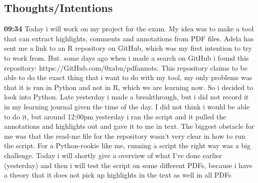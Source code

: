 \documentclass{article}
\begin{document}
\subsection{Thoughts/Intentions}
\textbf{09:34} Today i will work on my project for the exam. My idea was to make a tool that can extract highlights, comments and annotations from PDF files. Adela has sent me a link to an R repository on GitHub, which was my first intention to try to work from. But. some days ago when i made a search on GitHub i found this repository: https://GitHub.com/0xabu/pdfannots. This repository claims to be able to do the exact thing that i want to do with my tool, my only problems was that it is run in Python and not in R, which we are learning now. So i decided to look into Python. Late yesterday i made a breakthrough, but i did not record it in my learning journal given the time of the day. I did not think i would be able to do it, but around 12:00pm yesterday i ran the script and it pulled the annotations and highlights out and gave it to me in text. The biggest obstacle for me was that the read-me file for the repository wasn't very clear in how to run the script. For a Python-rookie like me, running a script the right way was a big challenge. Today i will shortly give a overview of what I've done earlier (yesterday) and then i will test the script on some different PDFs, because i have a theory that it does not pick up highlights in the text as well in all PDFs
\end{document}

